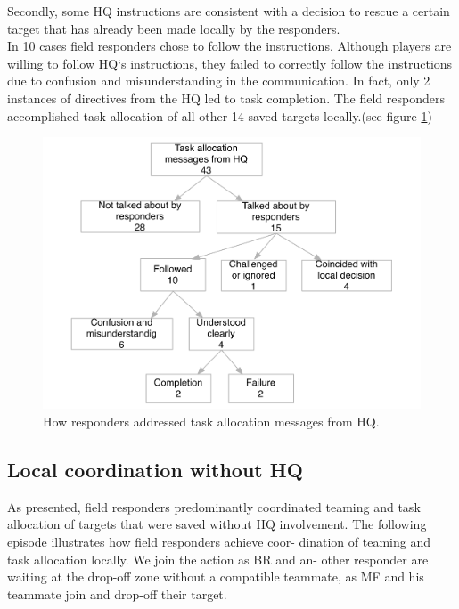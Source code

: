 Secondly, some HQ instructions are consistent with a decision to rescue a certain target that has already been made locally by the responders.\\

In 10 cases field responders chose to follow the instructions. Although players are willing to follow HQ`s instructions, they failed to correctly follow the instructions due to confusion and misunderstanding in the communication. In fact, only 2 instances of directives from the HQ led to task completion. The field responders accomplished task allocation of all other 14 saved targets locally.(see figure \ref{fig:intructions})\\

\begin{figure}[h]
  \centering
  \includegraphics[width=1\textwidth]{img/study1/instructions}
  \caption{How responders addressed task allocation messages from HQ.}
  \label{fig:intructions}
\end{figure}

\subsection{Local coordination without HQ}
As presented, field responders predominantly coordinated teaming and task allocation of targets that were saved without HQ involvement. The following episode illustrates how field responders achieve coor- dination of teaming and task allocation locally. We join the action as BR and an- other responder are waiting at the drop-off zone without a compatible teammate, as MF and his teammate join and drop-off their target.\\

